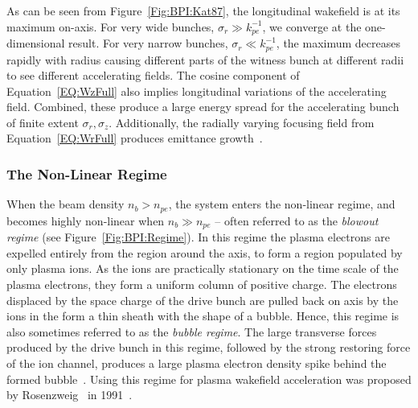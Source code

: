 As can be seen from Figure~\ref{Fig:BPI:Kat87}, the longitudinal wakefield is at its maximum on-axis.
For very wide bunches, $\sigma_{r} \gg k_{pe}^{-1}$, we converge at the one-dimensional result.
For very narrow bunches, $\sigma_{r} \ll k_{pe}^{-1}$, the maximum decreases rapidly with radius causing different parts of the witness bunch at different radii to see different accelerating fields.
The cosine component of Equation~\ref{EQ:WzFull} also implies longitudinal variations of the accelerating field.
Combined, these produce a large energy spread for the accelerating bunch of finite extent $\sigma_r, \sigma_z$.
Additionally, the radially varying focusing field from Equation~\ref{EQ:WrFull} produces emittance growth~\cite{muggli:2017,katsouleas:1987}.

\subsubsection{The Non-Linear Regime}
\label{Int:BPI:NLin}

When the beam density $n_{b} > n_{pe}$, the system enters the non-linear regime, and becomes highly non-linear when $n_{b} \gg n_{pe}$ -- often referred to as the \textit{blowout regime} (see Figure~\ref{Fig:BPI:Regime}).
In this regime the plasma electrons are expelled entirely from the region around the axis, to form a region populated by only plasma ions.
As the ions are practically stationary on the time scale of the plasma electrons, they form a uniform column of positive charge.
The electrons displaced by the space charge of the drive bunch are pulled back on axis by the ions in the form a thin sheath with the shape of a bubble.
Hence, this regime is also sometimes referred to as the \textit{bubble regime}.
The large transverse forces produced by the drive bunch in this regime, followed by the strong restoring force of the ion channel, produces a large plasma electron density spike behind the formed bubble~\cite{dawson:1959,rosenzweig:1991}.
Using this regime for plasma wakefield acceleration was proposed by Rosenzweig \etal ~in 1991~\cite{rosenzweig:1991}.

